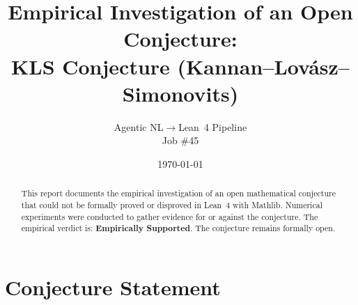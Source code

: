 \documentclass[11pt]{article}
\title{Empirical Investigation of an Open Conjecture:\\
KLS Conjecture (Kannan–Lovász–Simonovits)}
\author{Agentic NL$\to$Lean~4 Pipeline \\ \small Job \#45}
\date{\today}
\begin{document}
\maketitle

\begin{abstract}
This report documents the empirical investigation of an open mathematical conjecture
that could not be formally proved or disproved in Lean~4 with Mathlib.
Numerical experiments were conducted to gather evidence for or against the conjecture.
The empirical verdict is: \textbf{\textcolor{green!70!black}{Empirically Supported}}.
The conjecture remains formally open.
\end{abstract}

\section{Conjecture Statement}
\end{document}
